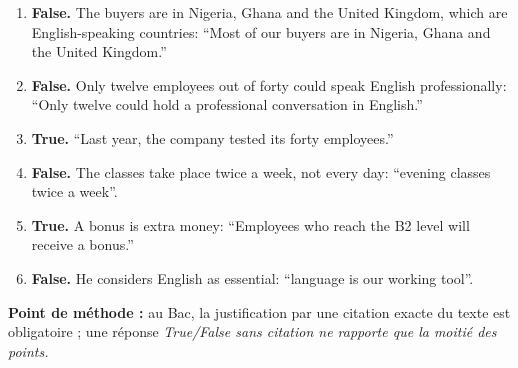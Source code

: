 \documentclass[11pt]{article}
\newcommand{\eng}[1]{\ifmmode\text{\textit{#1}}\else\begingroup\selectlanguage{english}\itshape #1\endgroup\fi}
\begin{document}
\begin{corrige}
\begin{enumerate}
\item \textbf{False.} The buyers are in Nigeria, Ghana and the United Kingdom, which are English-speaking countries: “Most of our buyers are in Nigeria, Ghana and the United Kingdom.”
\item \textbf{False.} Only twelve employees out of forty could speak English professionally: “Only twelve could hold a professional conversation in English.”
\item \textbf{True.} “Last year, the company tested its forty employees.”
\item \textbf{False.} The classes take place twice a week, not every day: “evening classes twice a week”.
\item \textbf{True.} A bonus is extra money: “Employees who reach the B2 level will receive a bonus.”
\item \textbf{False.} He considers English as essential: “language is our working tool”.
\end{enumerate}
\textbf{Point de méthode :} au Bac, la justification par une citation exacte du texte est obligatoire ; une réponse \eng{True/False} sans citation ne rapporte que la moitié des points.
\end{corrige}
\end{document}
